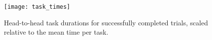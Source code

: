 \begin{figure}
\texttt{[image: task\_times]}
\caption{Head-to-head task durations for successfully completed trials, scaled relative to the mean
time per task.}
\label{fig:task_times}
\end{figure}
